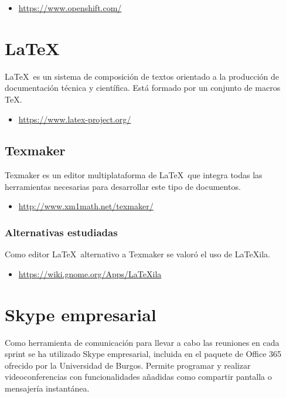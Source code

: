 \begin{itemize}
	\item \url{https://www.openshift.com/}
\end{itemize}

\section{LaTeX}

\LaTeX\ es un sistema de composición de textos orientado a la producción de documentación técnica y científica. Está formado por un conjunto de macros \TeX.

\begin{itemize}
	\item \url{https://www.latex-project.org/}
\end{itemize}

\subsection{Texmaker}

Texmaker es un editor multiplataforma de \LaTeX\ que integra todas las herramientas necesarias para desarrollar este tipo de documentos.

\begin{itemize}
	\item \url{http://www.xm1math.net/texmaker/}
\end{itemize}

\subsubsection{Alternativas estudiadas}

Como editor \LaTeX\ alternativo a Texmaker se valoró el uso de LaTeXila.

\begin{itemize}
	\item \url{https://wiki.gnome.org/Apps/LaTeXila}
\end{itemize}

\section{Skype empresarial}

Como herramienta de comunicación para llevar a cabo las reuniones en cada sprint se ha utilizado Skype empresarial, incluida en el paquete de Office 365 ofrecido por la Universidad de Burgos. Permite programar y realizar videoconferencias con funcionalidades añadidas como compartir pantalla o mensajería instantánea.

